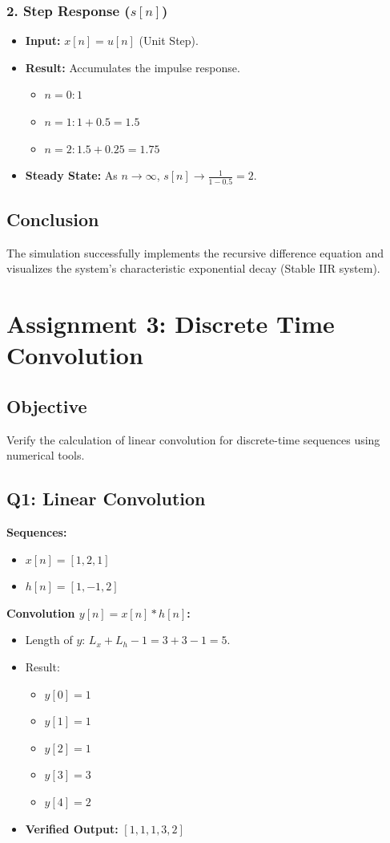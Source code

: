 \documentclass[11pt, a4paper]{article}
\begin{document}
\subsubsection{2. Step Response ($s[n]$)}
\begin{itemize}
    \item \textbf{Input:} $x[n] = u[n]$ (Unit Step).
    \item \textbf{Result:} Accumulates the impulse response.
    \begin{itemize}
        \item $n=0: 1$
        \item $n=1: 1 + 0.5 = 1.5$
        \item $n=2: 1.5 + 0.25 = 1.75$
    \end{itemize}
    \item \textbf{Steady State:} As $n \to \infty$, $s[n] \to \frac{1}{1 - 0.5} = 2$.
\end{itemize}

\subsection{Conclusion}
The simulation successfully implements the recursive difference equation and visualizes the system's characteristic exponential decay (Stable IIR system).

\newpage
\section{Assignment 3: Discrete Time Convolution}
\subsection{Objective}
Verify the calculation of linear convolution for discrete-time sequences using numerical tools.

\subsection{Q1: Linear Convolution}
\textbf{Sequences:}
\begin{itemize}
    \item $x[n] = [1, 2, 1]$
    \item $h[n] = [1, -1, 2]$
\end{itemize}

\textbf{Convolution $y[n] = x[n] * h[n]$:}
\begin{itemize}
    \item Length of $y$: $L_x + L_h - 1 = 3 + 3 - 1 = 5$.
    \item Result:
    \begin{itemize}
        \item $y[0] = 1$
        \item $y[1] = 1$
        \item $y[2] = 1$
        \item $y[3] = 3$
        \item $y[4] = 2$
    \end{itemize}
    \item \textbf{Verified Output:} $[1, 1, 1, 3, 2]$
\end{itemize}
\end{document}
